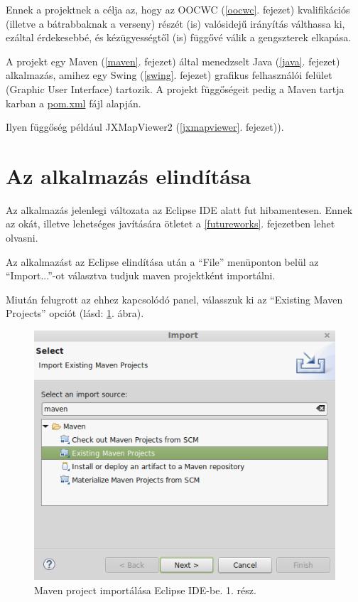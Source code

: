 \documentclass[a4paper,12pt]{report}
\begin{document}
Ennek a projektnek a célja az, hogy az OOCWC (\ref{oocwc}. fejezet) kvalifikációs (illetve a bátrabbaknak a verseny) részét (is) valósidejű irányítás válthassa ki, ezáltal érdekesebbé, és kézügyességtől (is) függővé válik a gengszterek elkapása.

\vspace{2mm}
A projekt egy Maven (\ref{maven}. fejezet) által menedzselt Java (\ref{java}. fejezet) alkalmazás, amihez egy Swing (\ref{swing}. fejezet) grafikus felhasználói felület (Graphic User Interface) tartozik. A projekt függőségeit pedig a Maven tartja karban a \url{pom.xml} fájl alapján. 

\vspace{2mm}
Ilyen függőség például JXMapViewer2 \cite{jxmapv} (\ref{jxmapviewer}. fejezet)).


\section{Az alkalmazás elindítása}
\label{howtorun}

Az alkalmazás jelenlegi változata az Eclipse IDE alatt fut hibamentesen. Ennek az okát, illetve lehetséges javítására ötletet a \ref{futureworks}. fejezetben lehet olvasni. 

\vspace{2mm}
Az alkalmazást az Eclipse elindítása után a ``File'' menüponton belül az ``Import...''-ot választva tudjuk maven projektként importálni.

\vspace{2mm}
Miután felugrott az ehhez kapcsolódó panel, válasszuk ki az ``Existing Maven Projects'' opciót (lásd: \ref{importmaven1}. ábra).

\begin{figure}[ht]
\centerline{
\includegraphics[width=5in]{img/importmavenproject}}
\caption{Maven project importálása Eclipse IDE-be. 1. rész.}
\label{importmaven1}
\end{figure}
\end{document}
